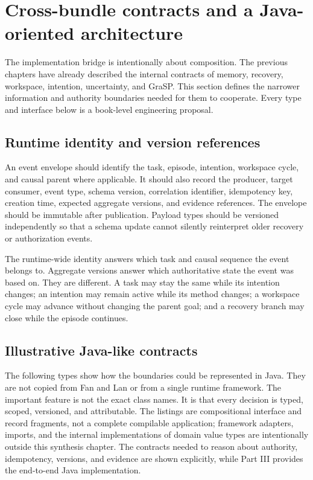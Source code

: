 \section{Cross-bundle contracts and a Java-oriented architecture}
\label{sec:ch18-cross-bundle-contracts}

The implementation bridge is intentionally about composition. The previous chapters have already described the internal contracts of memory, recovery, workspace, intention, uncertainty, and GraSP. This section defines the narrower information and authority boundaries needed for them to cooperate. Every type and interface below is a book-level engineering proposal.

\subsection{Runtime identity and version references}
\label{subsec:ch18-runtime-identity}

An event envelope should identify the task, episode, intention, workspace cycle, and causal parent where applicable. It should also record the producer, target consumer, event type, schema version, correlation identifier, idempotency key, creation time, expected aggregate versions, and evidence references. The envelope should be immutable after publication. Payload types should be versioned independently so that a schema update cannot silently reinterpret older recovery or authorization events.

The runtime-wide identity answers which task and causal sequence the event belongs to. Aggregate versions answer which authoritative state the event was based on. They are different. A task may stay the same while its intention changes; an intention may remain active while its method changes; a workspace cycle may advance without changing the parent goal; and a recovery branch may close while the episode continues.

\subsection{Illustrative Java-like contracts}
\label{subsec:ch18-java-contracts}

The following types show how the boundaries could be represented in Java. They are not copied from Fan and Lan or from a single runtime framework. The important feature is not the exact class names. It is that every decision is typed, scoped, versioned, and attributable. The listings are compositional interface and record fragments, not a complete compilable application; framework adapters, imports, and the internal implementations of domain value types are intentionally outside this synthesis chapter. The contracts needed to reason about authority, idempotency, versions, and evidence are shown explicitly, while Part III provides the end-to-end Java implementation.

